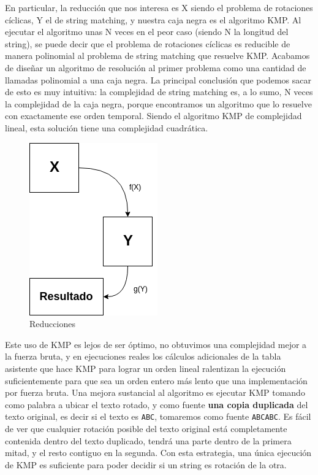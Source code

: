 \documentclass{article}
\begin{document}
En particular, la reducción que nos interesa es X siendo el problema de rotaciones cíclicas, Y el de string matching, y nuestra caja negra es el algoritmo KMP. Al ejecutar el algoritmo unas N veces en el peor caso (siendo N la longitud del string), se puede decir que el problema de rotaciones cíclicas es reducible de manera polinomial al problema de string matching que resuelve KMP. Acabamos de diseñar un algoritmo de resolución al primer problema como una cantidad de llamadas polinomial a una caja negra. La principal conclusión que podemos sacar de esto es muy intuitiva: la complejidad de string matching es, a lo sumo, N veces la complejidad de la caja negra, porque encontramos un algoritmo que lo resuelve con exactamente ese orden temporal. Siendo el algoritmo KMP de complejidad lineal, esta solución tiene una complejidad cuadrática. 

\begin{figure}[!htp]
    \centering
    \includegraphics[scale=0.5]{res/reduccion.png} 
    \caption{Reducciones}
\end{figure}

Este uso de KMP es lejos de ser óptimo, no obtuvimos una complejidad mejor a la fuerza bruta, y en ejecuciones reales los cálculos adicionales de la tabla asistente que hace KMP para lograr un orden lineal ralentizan la ejecución suficientemente para que sea un orden entero más lento que una implementación por fuerza bruta. Una mejora sustancial al algoritmo es ejecutar KMP tomando como palabra a ubicar el texto rotado, y como fuente \textbf{una copia duplicada} del texto original, es decir si el texto es \texttt{ABC}, tomaremos como fuente \texttt{ABCABC}. Es fácil de ver que cualquier rotación posible del texto original está completamente contenida dentro del texto duplicado, tendrá una parte dentro de la primera mitad, y el resto contiguo en la segunda. Con esta estrategia, una única ejecución de KMP es suficiente para poder decidir si un string es rotación de la otra. 
\end{document}

